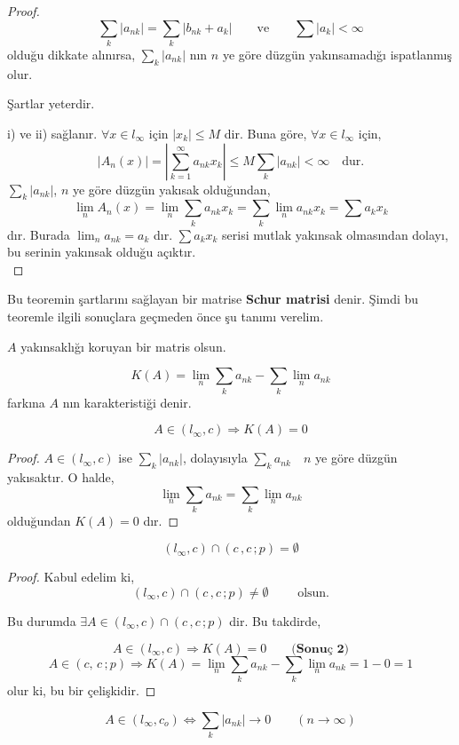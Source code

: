 \begin{proof}
$$
\sum\limits_k|a_{nk}|=\sum\limits_k|b_{nk}+a_k|\qquad\text{ve}\qquad\sum|a_k|<\infty
$$
olduğu dikkate alınırsa, $\sum\limits_k|a_{nk}|$ nın $n$ ye göre düzgün yakınsamadığı ispatlanmış olur.\

Şartlar yeterdir.

i) ve ii) sağlanır. $\forall x\in l_\infty$ için $|x_k|\leq M$ dir. Buna göre, $\forall x\in l_\infty$ için,
$$
|A_n(x)|=\left|\sum\limits_{k=1}^\infty a_{nk}x_k\right|\leq M \sum\limits_k|a_{nk}|<\infty\quad\text{dur.}
$$
$\sum\limits_k|a_{nk}|$, $n$ ye göre düzgün yakısak olduğundan,
$$
\lim_nA_n(x)=\lim_n\sum_k a_{nk}x_k=\sum_k\lim_na_{nk}x_k=\sum a_kx_k
$$
dır. Burada $\lim_na_{nk}=a_k$ dır. $\sum a_kx_k$ serisi mutlak yakınsak olmasından dolayı, bu serinin yakınsak olduğu açıktır.\\[5pt]
\end{proof}Bu teoremin şartlarını sağlayan bir matrise \textbf{Schur matrisi} denir. Şimdi bu teoremle ilgili sonuçlara geçmeden önce şu tanımı verelim.

\begin{definition}
$A$ yakınsaklığı koruyan bir matris olsun.

$$
K(A)=\lim_n\sum_ka_{nk}-\sum_k\lim_na_{nk}
$$
farkına $A$ nın karakteristiği denir.
\end{definition}
\begin{corollary}
$$A\in(l_\infty,c)\Rightarrow K(A)=0$$
\end{corollary}
\begin{proof}
$A\in(l_\infty,c)$ ise $\sum_k|a_{nk}|$, dolayısıyla $\sum_ka_{nk}\,\,$ $\,\,n$ ye göre düzgün yakısaktır. O halde,
$$
\lim_n\sum_ka_{nk}=\sum_k\lim_na_{nk}
$$
olduğundan $K(A)=0$ dır.
\end{proof}
\begin{corollary}
$$
(l_\infty,c)\cap (c\,,c\,;p)=\emptyset
$$
\end{corollary}

\begin{proof}
Kabul edelim ki, $$(l_\infty,c)\cap (c\,,c\,;p)\neq\emptyset\qquad\text{ olsun.}$$

Bu durumda $\exists A\in (l_\infty,c)\cap(c\,,c\,;p)$ dir. Bu takdirde,

$$
A\in(l_\infty,c)\Rightarrow K(A)=0\qquad\textbf{(Sonuç 2)}
$$
$$
A\in(c,\,c\,;p)\Rightarrow K(A)=\lim_n\sum_ka_{nk}-\sum_k\lim_na_{nk}=1-0=1
$$ olur ki, bu bir çelişkidir.
\end{proof}

\begin{corollary}
$$
A\in(l_\infty,c_o)\iff\sum_k|a_{nk}|\to 0\qquad(n\to\infty)
$$
\end{corollary}

